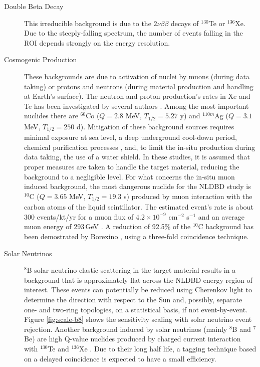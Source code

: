 \begin{description}
\item[Double Beta Decay] This irreducible background is due to the $2\nu\beta\beta$ decays of $^{130}$Te or $^{136}$Xe. Due to the steeply-falling
spectrum, the number of events falling in the ROI depends strongly on the energy resolution.
\item[Cosmogenic Production] These backgrounds are due to activation of nuclei by muons (during data taking) or protons and neutrons (during material production and handling at Earth's surface). The neutron and proton production's rates in Xe and Te has been investigated by several authors \cite{mei09, baudis15, zhang16, norm05, bard97, wang15, lozza15}. Among the most important nuclides there are $^{60}$Co ($Q=2.8$ MeV, $T_{1/2}=5.27$ y) and $^{110m}$Ag ($Q=3.1$ MeV, $T_{1/2}=250$ d). Mitigation of these background sources requires minimal exposure at sea level, a deep underground cool-down period, chemical purification processes \cite{snop16}, and, to limit the in-situ production during data taking, the use of a water shield. In these studies, it is assumed that proper measures are taken to handle the target material, reducing the background to a negligible level. For what concerns the in-situ muon induced background, the most dangerous nuclide for the NLDBD study is $^{10}$C ($Q=3.65$ MeV, $T_{1/2}=19.3$ s) produced by muon interaction with the carbon atoms of the liquid scintillator. The estimated event's rate is about 300 events/kt/yr \cite{hagn00} for a muon flux of $4.2\times10^{-9}$ cm$^{-2}$ s$^{-1}$ and an average muon energy of 293\,GeV \cite{mei06}. A reduction of 92.5\% of the $^{10}$C background has been demostrated by Borexino \cite{bxo2013}, using a three-fold coincidence technique\cite{galb05, gando16}.
\item[Solar Neutrinos] $^{8}$B solar neutrino elastic scattering in the target material results in a background that is approximately flat across the NLDBD energy region of interest. These events can potentially be reduced using Cherenkov light to determine the direction with respect to the Sun and, possibly, separate one- and two-ring topologies, on a statistical basis, if not event-by-event. Figure \ref{fig:scale-b8} shows the sensitivity scaling with solar neutrino event rejection.
Another background induced by solar neutrinos (mainly $^{8}$B and $^{7}$Be) are high Q-value nuclides produced by charged current interaction with $^{130}$Te and $^{136}$Xe \cite{eijiri14, eijiri17}. Due to their long half life, a tagging technique based on a delayed coincidence is expected to have a small efficiency. 

\end{description}
